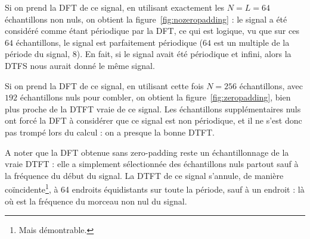 \documentclass{article}
\begin{document}
Si on prend la DFT de ce signal, en utilisant exactement les $N=L=64$ échantillons non nuls, on obtient la figure~\ref{fig:nozeropadding} : le signal a été considéré comme étant périodique par la DFT, ce qui est logique, vu que sur ces $64$ échantillons, le signal est parfaitement périodique ($64$ est un multiple de la période du signal, $8$). En fait, si le signal avait été périodique et infini, alors la DTFS nous aurait donné le même signal.

Si on prend la DFT de ce signal, en utilisant cette fois $N=256$ échantillons, avec $192$ échantillons nuls pour combler, on obtient la figure~\ref{fig:zeropadding}, bien plus proche de la DTFT vraie de ce signal. Les échantillons supplémentaires nuls ont forcé la DFT à considérer que ce signal est non périodique, et il ne s'est donc pas trompé lors du calcul : on a presque la bonne DTFT.

A noter que la DFT obtenue sans zero-padding reste un échantillonnage de la vraie DTFT : elle a simplement sélectionnée des échantillons nuls partout sauf à la fréquence du début du signal. La DTFT de ce signal s'annule, de manière coïncidente\footnote{Mais démontrable.}, à 64 endroits équidistants sur toute la période, sauf à un endroit : là où est la fréquence du morceau non nul du signal.
\end{document}
